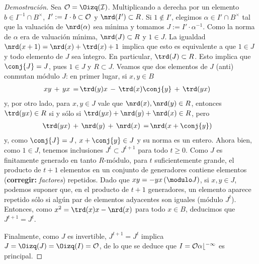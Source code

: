 \begin{proof}[Demostraci\'{o}n]
	Sea $\cal{O}=\Oizq(I)$. Multiplicando a derecha por un elemento
	$b\in I^{-1}\cap B^{\times}$, $I':=I\cdot b\subset\cal{O}$
	y $\nrd(I')\subset R$.
	Si $1\not\in I'$,
	elegimos $\alpha\in I'\cap B^{\times}$ tal que la
	valuaci\'{o}n de $\nrd(\alpha)$ sea m\'{\i}nima y tomamos
	$J:=I'\cdot\alpha^{-1}$. Como la norma de $\alpha$ era de
	valuaci\'{o}n m\'{\i}nima, $\nrd(J)\subset R$ y $1\in J$.
	La igualdad $\nrd(x+1)=\nrd(x)+\trd(x)+1$ implica que esto es
	equivalente a que $1\in J$ y todo elemento de $J$ sea \'{\i}ntegro.
	En particular, $\trd(J)\subset R$. Esto implica que $\conj{J}=J$,
	pues $1\in J$ y $R\subset J$. Veamos que dos elementos de $J$
	(anti) conmutan m\'{o}dulo $J$: en primer lugar, si $x,y\in B$
	\begin{align*}
		xy\,+\,yx \,=\, & \trd(y)x\,-\,\trd(x)\conj{y}\,+\,
		\trd(yx)
	\end{align*}
	y, por otro lado, para $x,y\in J$ vale que $\nrd(x),\nrd(y)\in R$,
	entonces
	$\trd(yx)\in R$ si y s\'{o}lo si $\trd(yx)+\nrd(y)+\nrd(x)\in R$,
	pero
	\begin{align*}
		\trd(yx)\,+\,\nrd(y)\,+\,\nrd(x)\,=\, & \nrd(x+\conj{y})
	\end{align*}
	y, como $\conj{J}=J$, $x+\conj{y}\in J$ y su norma es un entero.
	Ahora bien, como $1\in J$, tenemos inclusiones $J^{t}\subset J^{t+1}$
	para todo $t\geq 0$. Como $J$ es finitamente generado en tanto
	$R$-m\'{o}dulo, para $t$ suficientemente grande, el producto de
	$t+1$ elementos en un conjunto de generadores contiene elementos
	(\textbf{corregir:} \textit{factores})
	repetidos. Dado que $xy=-yx\,(\modulo J)$, si $x,y\in J$, podemos
	suponer que, en el producto de $t+1$ generadores, un elemento
	aparece repetido s\'{o}lo si alg\'{u}n par de elementos adyacentes
	son iguales (m\'{o}dulo $J^{t}$). Entonces, como
	$x^{2}=\trd(x)x-\nrd(x)$ para todo $x\in B$, deducimos que
	$J^{t+1}=J^{t}$.

	Finalmente, como $J$ es invertible, $J^{t+1}=J^{t}$ implica
	$J=\Oizq(J)=\Oizq(I)=\cal{O}$, de lo que se deduce que
	$I=\cal{O}\alpha b^{-1}$ es principal.
\end{proof}

